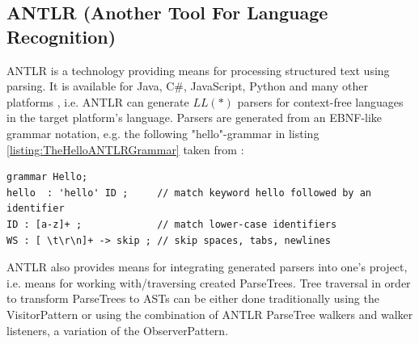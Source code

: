 \subsection{ANTLR (Another Tool For Language Recognition)}
\label{subsection:ANTLR}
\Gls{ANTLR} \cite{Parr:2013:DAR:2501720} is a technology providing means for processing structured text using parsing.
It is available for \gls{Java}, C\#, JavaScript, Python and many other platforms \cite{antlr.org}, i.e. \Gls{ANTLR} can generate $LL(*)$ parsers for context-free languages in the target platform's language.
Parsers are generated from an EBNF-like grammar notation, e.g. the following "hello"-grammar in listing \ref{listing:TheHelloANTLRGrammar} taken from \cite{ANTLRv4GettingStarted}:
\begin{lstlisting}[caption={The Hello ANTLR grammar},label={listing:TheHelloANTLRGrammar}]
grammar Hello;
hello  : 'hello' ID ;     // match keyword hello followed by an identifier
ID : [a-z]+ ;             // match lower-case identifiers
WS : [ \t\r\n]+ -> skip ; // skip spaces, tabs, newlines
\end{lstlisting}

\Gls{ANTLR} also provides means for integrating generated parsers into one's project, i.e. means for working with/traversing created \glspl{ParseTree}.
Tree traversal in order to transform \glspl{ParseTree} to \glspl{AST} can be either done traditionally using the \gls{VisitorPattern} or using the combination of \gls{ANTLR} \gls{ParseTree} walkers and walker listeners, a variation of the \gls{ObserverPattern}.

